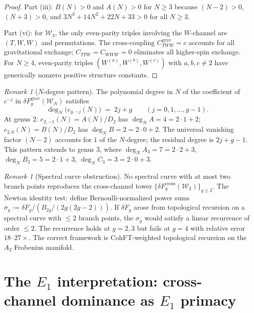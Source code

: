\documentclass[11pt]{article}
\theoremstyle{definition}
\theoremstyle{remark}
\newtheorem{remark}[theorem]{Remark}
\newcommand{\Walg}{\mathcal{W}}
\newcommand{\cross}{\mathrm{cross}}
\newcommand{\grav}{\mathrm{grav}}
\numberwithin{equation}{section}
\begin{document}
\begin{proof}
Part (iii): $B(N) > 0$ and $A(N) > 0$ for $N \geq 3$
because $(N{-}2) > 0$, $(N{+}3) > 0$, and
$3N^3 + 14N^2 + 22N + 33 > 0$ for all $N \geq 3$.

Part (vi): for $\Walg_3$, the only even-parity triples
involving the $W$-channel are $(T,W,W)$ and permutations.
The cross-coupling $C_{TWW}^{\grav} = c$ accounts for all
gravitational exchange; $C_{TTW} = C_{WWW} = 0$ eliminates
all higher-spin exchange.
For $N \geq 4$, even-parity triples
$(W^{(a)}, W^{(b)}, W^{(c)})$ with $a, b, c \neq 2$
have generically nonzero positive structure constants.
\end{proof}

\begin{remark}[$N$-degree pattern]\label{rem:n-degree}
The polynomial degree in $N$ of the coefficient of $c^{-j}$
in $\delta F_g^{\grav}(\Walg_N)$ satisfies
\begin{equation}\label{eq:n-degree-pattern}
 \deg_N\!\bigl(e_{g,-j}(N)\bigr)
 \;=\; 2j + g
 \qquad (j = 0, 1, \ldots, g{-}1).
\end{equation}
At genus $2$:
$e_{2,-1}(N) = A(N)/D_2$ has $\deg_N A = 4 = 2{\cdot}1+2$;
$e_{2,0}(N) = B(N)/D_2$ has $\deg_N B = 2 = 2{\cdot}0+2$.
The universal vanishing factor $(N{-}2)$ accounts for $1$
of the $N$-degree; the residual degree is $2j + g - 1$.
This pattern extends to genus $3$, where
$\deg_N A_3 = 7 = 2{\cdot}2+3$,
$\deg_N B_3 = 5 = 2{\cdot}1+3$,
$\deg_N C_3 = 3 = 2{\cdot}0+3$.
\end{remark}

\begin{remark}[Spectral curve obstruction]\label{rem:spectral-curve}
No spectral curve with at most two branch points reproduces
the cross-channel tower
$\{\delta F_g^{\cross}(\Walg_3)\}_{g \geq 2}$.
The Newton identity test: define Bernoulli-normalized power sums
$\sigma_g := \delta F_g/(B_{2g}/(2g(2g{-}2)))$.
If $\delta F_g$ arose from topological recursion on a spectral
curve with $\leq 2$ branch points, the $\sigma_g$ would satisfy
a linear recurrence of order $\leq 2$.
The recurrence holds at $g = 2, 3$ but fails at $g = 4$ with
relative error $18$--$27\times$.
The correct framework is CohFT-weighted topological recursion
on the $A_2$ Frobenius manifold.
\end{remark}


\section{The $E_1$ interpretation: cross-channel
dominance as $E_1$ primacy}\label{sec:e1-interpretation}
\end{document}
